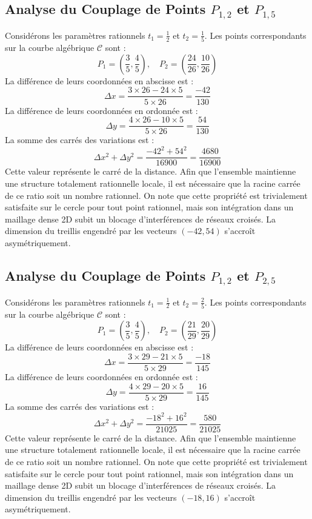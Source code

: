 \documentclass[12pt, a4paper]{article}
\begin{document}
\subsection{Analyse du Couplage de Points $P_{1,2}$ et $P_{1,5}$}
Considérons les paramètres rationnels $t_1 = \frac{1}{2}$ et $t_2 = \frac{1}{5}$.
Les points correspondants sur la courbe algébrique $\mathcal{C}$ sont :
$$ P_1 = \left( \frac{3}{5}, \frac{4}{5} \right), \quad P_2 = \left( \frac{24}{26}, \frac{10}{26} \right) $$
La différence de leurs coordonnées en abscisse est :
$$ \Delta x = \frac{3 \times 26 - 24 \times 5}{5 \times 26} = \frac{-42}{130} $$
La différence de leurs coordonnées en ordonnée est :
$$ \Delta y = \frac{4 \times 26 - 10 \times 5}{5 \times 26} = \frac{54}{130} $$
La somme des carrés des variations est :
$$ \Delta x^2 + \Delta y^2 = \frac{ -42^2 + 54^2 }{ 16900 } = \frac{ 4680 }{ 16900 } $$
Cette valeur représente le carré de la distance. Afin que l'ensemble maintienne une structure totalement rationnelle locale, il est nécessaire que la racine carrée de ce ratio soit un nombre rationnel. On note que cette propriété est trivialement satisfaite sur le cercle pour tout point rationnel, mais son intégration dans un maillage dense 2D subit un blocage d'interférences de réseaux croisés. La dimension du treillis engendré par les vecteurs $( -42, 54 )$ s'accroît asymétriquement.


\subsection{Analyse du Couplage de Points $P_{1,2}$ et $P_{2,5}$}
Considérons les paramètres rationnels $t_1 = \frac{1}{2}$ et $t_2 = \frac{2}{5}$.
Les points correspondants sur la courbe algébrique $\mathcal{C}$ sont :
$$ P_1 = \left( \frac{3}{5}, \frac{4}{5} \right), \quad P_2 = \left( \frac{21}{29}, \frac{20}{29} \right) $$
La différence de leurs coordonnées en abscisse est :
$$ \Delta x = \frac{3 \times 29 - 21 \times 5}{5 \times 29} = \frac{-18}{145} $$
La différence de leurs coordonnées en ordonnée est :
$$ \Delta y = \frac{4 \times 29 - 20 \times 5}{5 \times 29} = \frac{16}{145} $$
La somme des carrés des variations est :
$$ \Delta x^2 + \Delta y^2 = \frac{ -18^2 + 16^2 }{ 21025 } = \frac{ 580 }{ 21025 } $$
Cette valeur représente le carré de la distance. Afin que l'ensemble maintienne une structure totalement rationnelle locale, il est nécessaire que la racine carrée de ce ratio soit un nombre rationnel. On note que cette propriété est trivialement satisfaite sur le cercle pour tout point rationnel, mais son intégration dans un maillage dense 2D subit un blocage d'interférences de réseaux croisés. La dimension du treillis engendré par les vecteurs $( -18, 16 )$ s'accroît asymétriquement.
\end{document}
